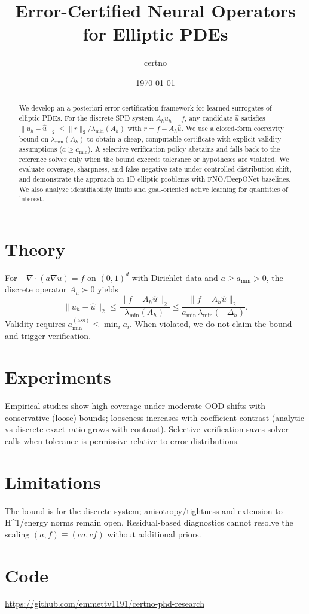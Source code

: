 \documentclass[10pt]{article}
\title{Error-Certified Neural Operators for Elliptic PDEs}
\author{certno}
\date{\today}
\begin{document}
\maketitle

\begin{abstract}
We develop an a posteriori error certification framework for learned surrogates of elliptic PDEs. For the discrete SPD system $A_h u_h = f$, any candidate $\hat{u}$ satisfies $\|u_h - \hat{u}\|_2 \le \|r\|_2 / \lambda_{\min}(A_h)$ with $r=f-A_h\hat{u}$. We use a closed-form coercivity bound on $\lambda_{\min}(A_h)$ to obtain a cheap, computable certificate with explicit validity assumptions ($a\ge a_{\min}$). A selective verification policy abstains and falls back to the reference solver only when the bound exceeds tolerance or hypotheses are violated. We evaluate coverage, sharpness, and false-negative rate under controlled distribution shift, and demonstrate the approach on 1D elliptic problems with FNO/DeepONet baselines. We also analyze identifiability limits and goal-oriented active learning for quantities of interest.
\end{abstract}

\section{Theory}
For $-\nabla\cdot(a\nabla u)=f$ on $(0,1)^d$ with Dirichlet data and $a\ge a_{\min}>0$, the discrete operator $A_h\succ 0$ yields
$$
\|u_h - \hat{u}\|_2 \le \frac{\|f - A_h \hat{u}\|_2}{\lambda_{\min}(A_h)} \le \frac{\|f - A_h \hat{u}\|_2}{a_{\min}\,\lambda_{\min}(-\Delta_h)}.
$$
Validity requires $a_{\min}^{(\text{ass})}\le \min_i a_i$. When violated, we do not claim the bound and trigger verification.

\section{Experiments}
Empirical studies show high coverage under moderate OOD shifts with conservative (loose) bounds; looseness increases with coefficient contrast (analytic vs discrete-exact ratio grows with contrast). Selective verification saves solver calls when tolerance is permissive relative to error distributions.

\section{Limitations}
The bound is for the discrete system; anisotropy/tightness and extension to H^1/energy norms remain open. Residual-based diagnostics cannot resolve the scaling $(a,f)\equiv(ca,cf)$ without additional priors.

\section{Code}
\url{https://github.com/emmettv1191/certno-phd-research}
\end{document}
